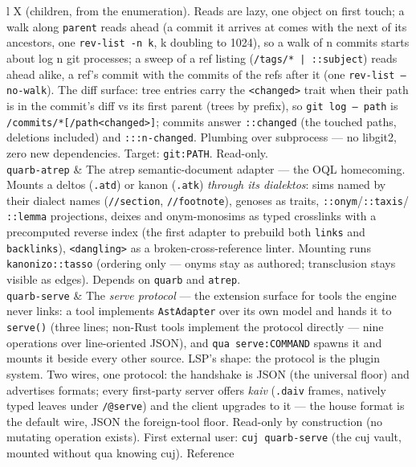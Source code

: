 \documentclass{report}
\begin{document}
\begin{xltabular}{\textwidth}{l X}
  (children, from the enumeration). Reads are lazy, one object on
  first touch; a walk along \texttt{parent} reads ahead (a commit
  it arrives at comes with the next of its ancestors, one
  \texttt{rev-list -n k}, k doubling to 1024), so a walk of n
  commits starts about log n git processes; a sweep of a ref
  listing (\texttt{/tags/* | ::subject}) reads ahead alike, a
  ref's commit with the commits of the refs after it (one
  \texttt{rev-list --no-walk}). The diff surface: tree
  entries carry the \texttt{<changed>} trait when their path is
  in the commit's diff vs its first parent (trees by prefix), so
  \texttt{git log -- path} is
  \texttt{/commits/*[/path<changed>]}; commits answer
  \texttt{::changed} (the touched paths, deletions included)
  and \texttt{:::n-changed}. Plumbing over subprocess —
  no libgit2, zero new dependencies. Target: \texttt{git:PATH}.
  Read-only. \\
\texttt{quarb-atrep} & The atrep semantic-document adapter —
  the OQL homecoming. Mounts a deltos (\texttt{.atd}) or kanon
  (\texttt{.atk}) \emph{through its dialektos}: sims named by
  their dialect names (\texttt{//section}, \texttt{//footnote}),
  genoses as traits, \texttt{::onym}/\texttt{::taxis}/
  \texttt{::lemma} projections, deixes and onym-monosims as
  typed crosslinks with a precomputed reverse index (the first
  adapter to prebuild both \texttt{links} and
  \texttt{backlinks}), \texttt{<dangling>} as a
  broken-cross-reference linter. Mounting runs
  \texttt{kanonizo::tasso} (ordering only — onyms stay as
  authored; transclusion stays visible as edges). Depends on
  \texttt{quarb} and \texttt{atrep}. \\
\texttt{quarb-serve} & The \emph{serve protocol} — the
  extension surface for tools the engine never links: a tool
  implements \texttt{AstAdapter} over its own model and hands it
  to \texttt{serve()} (three lines; non-Rust tools implement the
  protocol directly — nine operations over line-oriented JSON),
  and \texttt{qua serve:COMMAND} spawns it and mounts it beside
  every other source. LSP's shape: the protocol is the plugin
  system. Two wires, one protocol: the handshake is JSON (the
  universal floor) and advertises formats; every first-party
  server offers \emph{kaiv} (\texttt{.daiv} frames, natively
  typed leaves under \texttt{/@serve}) and the client upgrades
  to it — the house format is the default wire, JSON the
  foreign-tool floor. Read-only by construction (no mutating
  operation exists). First external user: \texttt{cuj quarb-serve}
  (the cuj vault, mounted without qua knowing cuj). Reference

\end{xltabular}
\end{document}
